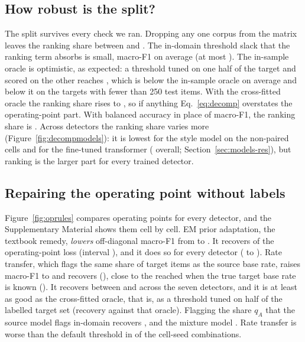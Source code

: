 \subsection{How robust is the split?}\label{sec:robust}
The split survives every check we ran. Dropping any one corpus from the matrix leaves the ranking share between \RankShareDropMin{} and \RankShareDropMax. The in-domain threshold slack that the ranking term absorbs is small, \SlackFone{} macro-F1 on average (at most \SlackFoneMax). The in-sample oracle is optimistic, as expected: a threshold tuned on one half of the target and scored on the other reaches \OracleCF{}, which is \OracleCFbias{} below the in-sample oracle on average and \OracleCFbiasSmall{} below it on the targets with fewer than 250 test items. With the cross-fitted oracle the ranking share rises to \RankShareCF{}, so if anything Eq.~\eqref{eq:decomp} overstates the operating-point part. With balanced accuracy in place of macro-F1, the ranking share is \BARankShare{}. Across detectors the ranking share varies more (Figure~\ref{fig:decompmodels}): it is lowest for the style model on the non-paired cells and for the fine-tuned transformer (\FTRankShare{} overall; Section~\ref{sec:models-res}), but ranking is the larger part for every trained detector.

\subsection{Repairing the operating point without labels}\label{sec:op}
Figure~\ref{fig:oprules} compares operating points for every detector, and the Supplementary Material shows them cell by cell. EM prior adaptation, the textbook remedy, \emph{lowers} off-diagonal macro-F1 from \OPDef{} to \OPEM{}. It recovers \RecEM{} of the operating-point loss (interval \RecEMCI), and it does so for every detector (\RecEMMin{} to \RecEMMax). Rate transfer, which flags the same share of target items as the source base rate, raises macro-F1 to \OPRank{} and recovers \RecRank{} (\RecRankCI), close to the \RecPrior{} reached when the true target base rate is known (\OPPrior{}). It recovers between \RecRankMin{} and \RecRankMax{} across the seven detectors, and it is at least as good as the cross-fitted oracle, that is, as a threshold tuned on half of the labelled target set (recovery \RecRankCF{} against that oracle). Flagging the share $q_A$ that the source model flags in-domain recovers \RecSrcPPR, and the mixture model \RecGMM. Rate transfer is worse than the default threshold in \RankWorseShare{} of the cell-seed combinations.


